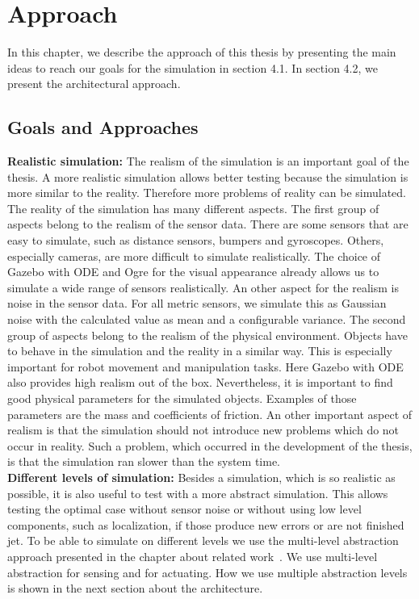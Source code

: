 \chapter{Approach}
In this chapter, we describe the approach of this thesis by presenting the main ideas to reach our goals for the simulation in section 4.1. In section 4.2, we present the architectural approach.

\section{Goals and Approaches}
\textbf{Realistic simulation:} The realism of the simulation is an important goal of the thesis. A more realistic simulation allows better testing because the simulation is more similar to the reality. Therefore more problems of reality can be simulated. The reality of the simulation has many different aspects. The first group of aspects belong to the realism of the sensor data. There are some sensors that are easy to simulate, such as distance sensors, bumpers and gyroscopes. Others, especially cameras, are more difficult to simulate realistically. The choice of Gazebo with ODE and Ogre for the visual appearance already allows us to simulate a wide range of sensors realistically. An other aspect for the realism is noise in the sensor data. For all metric sensors, we simulate this as Gaussian noise with the calculated value as mean and a configurable variance. The second group of aspects belong to the realism of the physical environment. Objects have to behave in the simulation and the reality in a similar way. This is especially important for robot movement and manipulation tasks. Here Gazebo with ODE also provides high realism out of the box. Nevertheless, it is important to find good physical parameters for the simulated objects. Examples of those parameters are the mass and coefficients of friction. An other important aspect of realism is that the simulation should not introduce new problems which do not occur in reality. Such a problem, which occurred in the development of the thesis, is that the simulation ran slower than the system time.\\
\textbf{Different levels of simulation:} Besides a simulation, which is so realistic as possible, it is also useful to test with a more abstract simulation. This allows testing the optimal case without sensor noise or without using low level components, such as localization, if those produce new errors or are not finished jet. To be able to simulate on different levels we use the multi-level abstraction approach presented in the chapter about related work~\cite{MultiLevelAbstraction}. We use multi-level abstraction for sensing and for actuating. How we use multiple abstraction levels is shown in the next section about the architecture.\\
